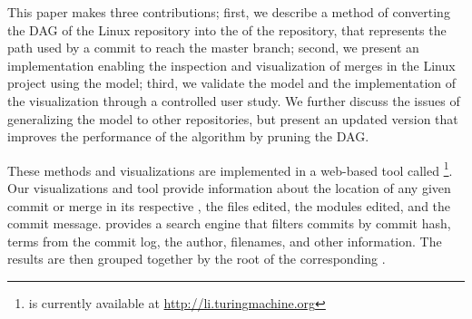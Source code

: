 This paper makes three contributions; first, we describe a method of
converting the DAG of the Linux repository into the \mt of the
repository, that represents the path used by a commit to reach the
master branch; second, we present an implementation enabling the
inspection and visualization of merges in the Linux project using the
\mt model; third, we validate the \mt model and the implementation of
the visualization through a controlled user study. We further discuss the
issues of generalizing the model to other repositories, but present an
updated version that improves the performance of the algorithm by
pruning the DAG.\@

These methods and visualizations are implemented in a web-based tool
called \tool\footnote{\tool is currently available at
  \url{http://li.turingmachine.org}}. Our visualizations and tool
provide information about the location of any given commit or merge in
its respective \mt, the files edited, the modules edited, and the
commit message. \tool provides a search engine that filters commits by
commit hash, terms from the commit log, the author, filenames, and other
information. The results are then grouped together by the root of the
corresponding \mt.
